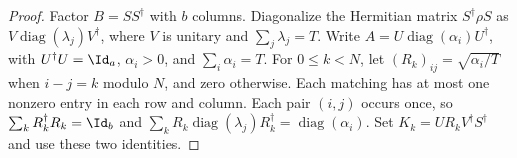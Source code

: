 \begin{proof}
    \leanok
    Factor $B=SS^\dagger$ with $b$ columns. Diagonalize the Hermitian
    matrix $S^\dagger\rho S$ as $V\operatorname{diag}(\lambda_j)V^\dagger$,
    where $V$ is unitary and $\sum_j\lambda_j=T$.
    Write $A=U\operatorname{diag}(\alpha_i)U^\dagger$, with
    $U^\dagger U=\Id_a$, $\alpha_i>0$, and $\sum_i\alpha_i=T$.
    For $0\le k<N$, let $(R_k)_{ij}=\sqrt{\alpha_i/T}$ when
    $i-j=k$ modulo $N$, and zero otherwise. Each matching has at most
    one nonzero entry in each row and column. Each pair $(i,j)$ occurs
    once, so $\sum_k R_k^\dagger R_k=\Id_b$ and
    $\sum_k R_k\operatorname{diag}(\lambda_j)R_k^\dagger
      =\operatorname{diag}(\alpha_i)$.
    Set $K_k=UR_kV^\dagger S^\dagger$ and use these two identities.
\end{proof}
